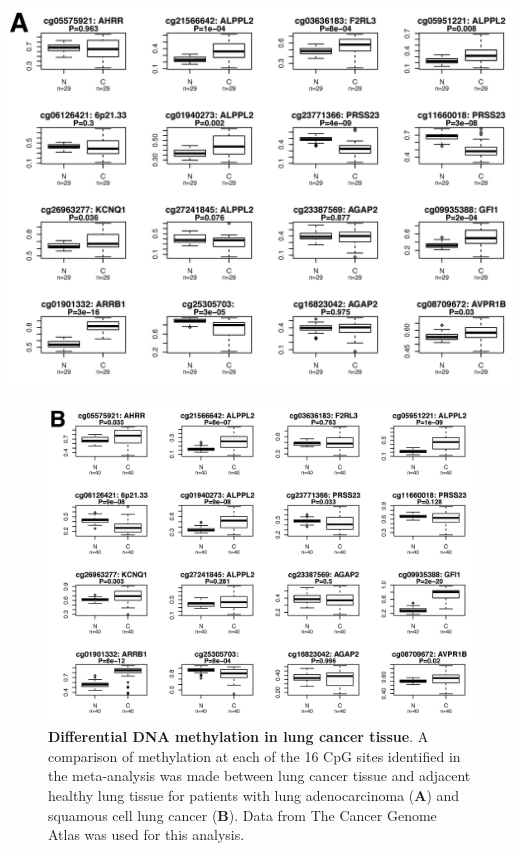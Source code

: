 \documentclass[11pt,oneside]{bristolthesis}
\begin{document}
\begin{center}\includegraphics[width=1\linewidth]{figure/07-dnam_lungcancer_mr/Figure_4a} \end{center}
\begin{figure}

{\centering \includegraphics[width=1\linewidth]{figure/07-dnam_lungcancer_mr/Figure_4b} 

}

\caption[Differential DNA methylation in lung cancer tissue]{\textbf{Differential DNA methylation in lung cancer tissue}. A comparison of methylation at each of the 16 CpG sites identified in the meta-analysis was made between lung cancer tissue and adjacent healthy lung tissue for patients with lung adenocarcinoma (\textbf{A}) and squamous cell lung cancer (\textbf{B}). Data from The Cancer Genome Atlas was used for this analysis.}\label{fig:fig4-07}
\end{figure}
\end{document}
